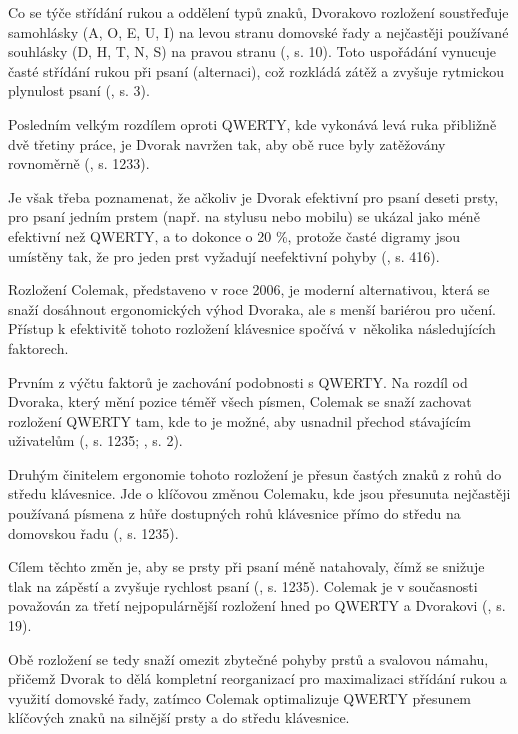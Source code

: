 \documentclass[a4paper, twoside, 12pt, czech]{article}
\begin{document}
Co se týče střídání rukou a oddělení typů znaků, Dvorakovo rozložení soustře\-ďuje 
samohlásky (A, O, E, U, I) na levou stranu domovské řady a nejčastěji 
používané souhlásky (D, H, T, N, S) na pravou stranu (\cite{textEntrySystems}, s. 10). Toto uspořádání 
vynucuje časté střídání rukou při psaní (alternaci), což rozkládá zátěž a 
zvyšuje rytmickou plynulost psaní (\cite{engramapproach}, s. 3).

Posledním velkým rozdílem oproti QWERTY, kde 
vykonává levá ruka přibliž\-ně dvě třetiny práce, je Dvorak navržen tak, aby obě 
ruce byly zatěžovány rovnoměrně (\cite{qwerty-dilemma}, s. 1233).

Je však třeba poznamenat, že ačkoliv je Dvorak efektivní pro 
psaní deseti prsty, pro psaní jedním prstem (např. na stylusu nebo mobilu) 
se ukázal jako méně efektivní než QWERTY, a to dokonce o 20 \%, protože časté 
digramy jsou umístěny tak, že pro jeden prst vyžadují neefektivní pohyby (\cite{diagramBasedLayout}, s. 416).


Rozložení Colemak, představeno v roce 2006, je moderní alternativou, která se 
snaží dosáhnout ergonomických výhod Dvoraka, ale s menší bariérou pro učení. 
Přístup k efektivitě tohoto rozložení klávesnice spočívá v~několika následujících faktorech.

Prvním z výčtu faktorů je zachování podobnosti s QWERTY. Na rozdíl od Dvoraka, 
který mění pozice téměř všech písmen, Colemak se snaží zachovat roz\-ložení QWERTY 
tam, kde to je možné, aby usnadnil přechod stávajícím uživatelům (\cite{qwerty-dilemma}, s. 1235; \cite{engramapproach}, s. 2).

Druhým činitelem ergonomie tohoto rozložení je přesun častých znaků z rohů do středu klávesnice. 
Jde o klíčovou změnou Colemaku, kde jsou přesunuta nejčas\-těji používaná písmena 
z hůře dostupných rohů klávesnice přímo do středu na domovskou řadu (\cite{qwerty-dilemma}, s. 1235).

Cílem těchto změn je, aby se prsty při psaní méně natahovaly, čímž se snižuje 
tlak na zápěstí a zvyšuje rychlost psaní (\cite{qwerty-dilemma}, s. 1235). Colemak je v současnosti považován za 
třetí nejpopulárnější rozložení hned po QWERTY a Dvorakovi (\cite{hidden-in-plain-sight}, s. 19).

Obě rozložení se tedy snaží omezit zbytečné pohyby prstů a svalovou námahu, 
přičemž Dvorak to dělá kompletní reorganizací pro maximalizaci střídání rukou a 
využití domovské řady, zatímco Colemak optimalizuje QWERTY přesunem klíčových 
znaků na silnější prsty a do středu klávesnice.
\end{document}
